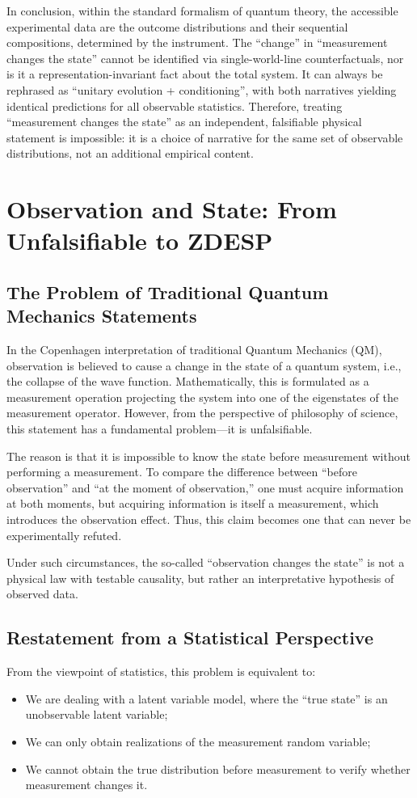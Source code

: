\documentclass[12pt,a4paper]{article}
\begin{document}
	In conclusion, within the standard formalism of quantum theory, the accessible experimental data are the outcome distributions and their sequential compositions, determined by the instrument. The ``change'' in ``measurement changes the state'' cannot be identified via single-world-line counterfactuals, nor is it a representation-invariant fact about the total system. It can always be rephrased as ``unitary evolution + conditioning'', with both narratives yielding identical predictions for all observable statistics. Therefore, treating ``measurement changes the state'' as an independent, falsifiable physical statement is impossible: it is a choice of narrative for the same set of observable distributions, not an additional empirical content.
	
	\section{Observation and State: From Unfalsifiable to ZDESP}
	
	\subsection{The Problem of Traditional Quantum Mechanics Statements}
	In the Copenhagen interpretation of traditional Quantum Mechanics (QM), observation is believed to cause a change in the state of a quantum system, i.e., the collapse of the wave function. Mathematically, this is formulated as a measurement operation projecting the system into one of the eigenstates of the measurement operator. However, from the perspective of philosophy of science, this statement has a fundamental problem—it is unfalsifiable.
	
	The reason is that it is impossible to know the state before measurement without performing a measurement. To compare the difference between “before observation” and “at the moment of observation,” one must acquire information at both moments, but acquiring information is itself a measurement, which introduces the observation effect. Thus, this claim becomes one that can never be experimentally refuted.
	
	Under such circumstances, the so-called “observation changes the state” is not a physical law with testable causality, but rather an interpretative hypothesis of observed data.
	
	\subsection{Restatement from a Statistical Perspective}
	From the viewpoint of statistics, this problem is equivalent to:
	\begin{itemize}
		\item We are dealing with a latent variable model, where the “true state” is an unobservable latent variable;
		\item We can only obtain realizations of the measurement random variable;
		\item We cannot obtain the true distribution before measurement to verify whether measurement changes it.
	\end{itemize}
	
\end{document}
